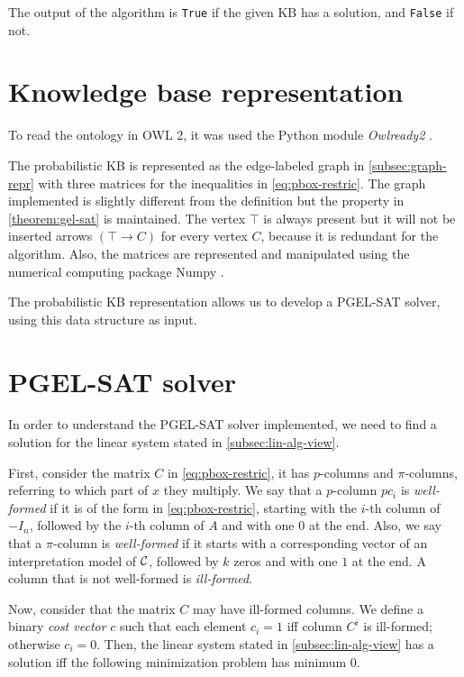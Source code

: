 The output of the algorithm is \texttt{True} if the given KB has a solution, and \texttt{False} if not.


\section{Knowledge base representation}
To read the ontology in OWL 2, it was used the Python module \textit{Owlready2} \citep{lamy2017owlready}.


The probabilistic KB is represented as the edge-labeled graph in \autoref{subsec:graph-repr} with three matrices for the inequalities in \autoref{eq:pbox-restric}. The graph implemented is slightly different from the definition but the property in \autoref{theorem:gel-sat} is maintained. The vertex $\top$ is always present but it will not be inserted arrows $(\top \to C)$ for every vertex $C$, because it is redundant for the algorithm. Also, the matrices are represented and manipulated using the numerical computing package Numpy \citep{numpy}.

The probabilistic KB representation allows us to develop a PGEL-SAT solver, using this data structure as input.

\section{PGEL-SAT solver}
\label{sec:pgelsatsolver}

In order to understand the PGEL-SAT solver implemented, we need to find a solution for the linear system stated in \autoref{subsec:lin-alg-view}.

First, consider the matrix $C$ in \autoref{eq:pbox-restric}, it has $p$-columns and $\pi$-columns, referring to which part of $x$ they multiply. We say that a $p$-column $pc_i$ is \emph{well-formed} if it is of the form in \autoref{eq:pbox-restric}, starting with the $i$-th column of $-I_n$, followed by the $i$-th column of $A$ and with one $0$ at the end. Also, we say that a $\pi$-column is \emph{well-formed} if it starts with a corresponding vector of an interpretation model of $\mathcal{C}$, followed by $k$ zeros and with one $1$ at the end. A column that is not well-formed is \emph{ill-formed}.

Now, consider that the matrix $C$ may have ill-formed columns. We define a binary \emph{cost vector} $c$ such that each element $c_i = 1$ iff column $C^i$ is ill-formed; otherwise $c_i = 0$. Then, the linear system stated in \autoref{subsec:lin-alg-view} has a solution iff the following minimization problem has minimum 0.

